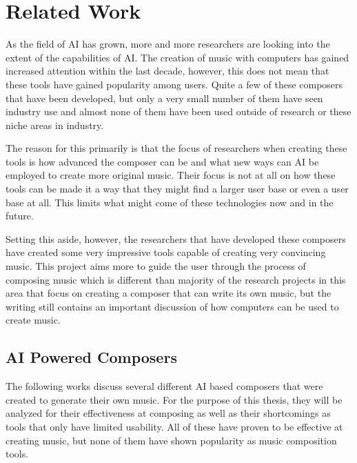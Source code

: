 \chapter{Related Work} 
\label{ch:relatedwork}

As the field of AI has grown, more and more researchers are looking into the extent of the capabilities of AI.  The creation of music with computers has gained increased attention within the last decade, however, this does not mean that these tools have gained popularity among users.  Quite a few of these composers that have been developed, but only a very small number of them have seen industry use and almost none of them have been used outside of research or these niche areas in industry.

\vspace{\baselineskip}

The reason for this primarily is that the focus of researchers when creating these tools is how advanced the composer can be and what new ways can AI be employed to create more original music.  Their focus is not at all on how these tools can be made it a way that they might find a larger user base or even a user base at all.  This limits what might come of these technologies now and in the future.

\vspace{\baselineskip}

Setting this aside, however, the researchers that have developed these composers have created some very impressive tools capable of creating very convincing music.  This project aims more to guide the user through the process of composing music which is different than majority of the research projects in this area that focus on creating a composer that can write its own music, but the writing still contains an important discussion of how computers can be used to create music.

\section{AI Powered Composers}
\label{sec:composers}

The following works discuss several different AI based composers that were created to generate their own music.  For the purpose of this thesis, they will be analyzed for their effectiveness at composing as well as their shortcomings as tools that only have limited usability.  All of these have proven to be effective at creating music, but none of them have shown popularity as music composition tools.

